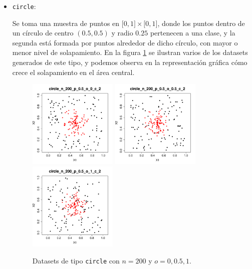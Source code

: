 \documentclass[a4paper,12pt]{report}
\theoremstyle{definition}
\begin{document}
\begin{itemize}
\item \verb|circle|:

  Se toma una muestra de puntos en $\lbrack 0,1 \rbrack \times \lbrack 0,1 \rbrack$, donde los puntos dentro de un círculo de centro $(0.5, 0.5)$ y radio $0.25$ pertenecen a una clase, y la segunda está formada por puntos alrededor de dicho círculo, con mayor o menor nivel de solapamiento. En la figura \ref{fig:circle} se ilustran varios de los datasets generados de este tipo, y podemos observa en la representación gráfica cómo crece el solapamiento en el área central.

  \begin{figure}[H]
    \centering
    \includegraphics[width=0.4\textwidth]{plots/circle_o_0}
    \includegraphics[width=0.4\textwidth]{plots/circle_o_1}
    \includegraphics[width=0.4\textwidth]{plots/circle_o_2}
    \caption{Datasets de tipo \texttt{circle} con $n = 200$ y $o = 0, 0.5, 1$.}
    \label{fig:circle}
  \end{figure}


\end{itemize}
\end{document}
